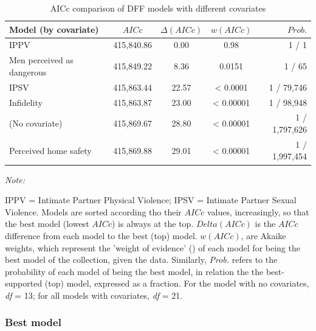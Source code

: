 \documentclass[
  bookmarksnumbered]{article}
\begin{document}
\begin{table}[H]
\centering
\caption{\label{tab:comp-m1}AICc comparison of DFF models with different covariates}
\centering
\begin{threeparttable}
\begin{tabular}[t]{lcccr}
\toprule
Model (by covariate) & $AICc$ & $\Delta(AICc)$ & $w(AICc)$ & $Prob.$\\
\midrule
IPPV & 415,840.86 & 0.00 & 0.98 & 1 / 1\\
Men perceived as dangerous & 415,849.22 & 8.36 & 0.0151 & 1 / 65\\
IPSV & 415,863.44 & 22.57 & < 0.0001 & 1 / 79,746\\
Infidelity & 415,863.87 & 23.00 & < 0.00001 & 1 / 98,948\\
(No covariate) & 415,869.67 & 28.80 & < 0.00001 & 1 / 1,797,626\\
Perceived home safety & 415,869.88 & 29.01 & < 0.00001 & 1 / 1,997,454\\
\bottomrule
\end{tabular}
\begin{tablenotes}[para]
\item \textit{Note: } 
\item IPPV = Intimate Partner Physical Violence; 
             IPSV = Intimate Partner Sexual Violence.
             Models are sorted according tho their $AICc$ values, increasingly, 
             so that the best model (lowest $AICc$) is always at the top. 
             $Delta(AICc)$ is the $AICc$ difference from each model to the best (top) model. 
             $w(AICc)$, are Akaike weights, which represent the 'weight of evidence'
             (\cite{portetPrimerModelSelection2020}) of each model for being the best model 
             of the collection, given the data. 
             Similarly, \textit{Prob.} refers to the probability of each model of being the 
             best model, in relation the the best-supported (top) model, expressed as a 
             fraction. For the model with no covariates, \textit{df} = 13; for all models 
             with covariates, \textit{df} = 21.
\end{tablenotes}
\end{threeparttable}
\end{table}

\subsubsection{Best model}\label{best-model}
\end{document}
